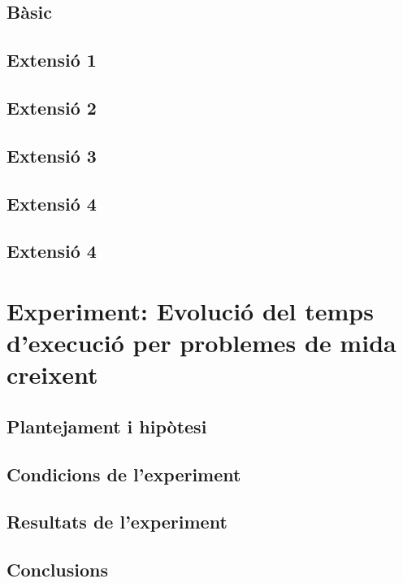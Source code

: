 \documentclass[11pt,a4paper]{article}
\begin{document}
\subsection{Bàsic}
\subsection{Extensió 1}
\subsection{Extensió 2}
\subsection{Extensió 3}
\subsection{Extensió 4}
\subsection{Extensió 4}

\section[Experiment extra]{Experiment: Evolució del temps d'execució per problemes de mida creixent}
\subsection{Plantejament i hipòtesi}
\subsection{Condicions de l'experiment}
\subsection{Resultats de l'experiment}
\subsection{Conclusions}
\end{document}
